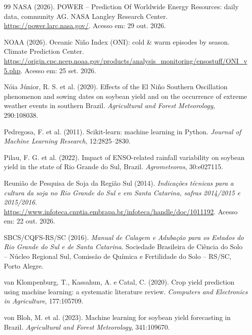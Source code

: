 \documentclass[12pt]{article}
\begin{document}
\begin{thebibliography}{99}
NASA (2026). POWER -- Prediction Of Worldwide Energy Resources: daily
data, community AG. NASA Langley Research Center.
\url{https://power.larc.nasa.gov/}. Acesso em: 29 out. 2026.

NOAA (2026). Oceanic Niño Index (ONI): cold \& warm episodes by season.
Climate Prediction Center.
\url{https://origin.cpc.ncep.noaa.gov/products/analysis_monitoring/ensostuff/ONI_v5.php}.
Acesso em: 25 set. 2026.

Nóia Júnior, R. S. et al. (2020). Effects of the El Niño Southern
Oscillation phenomenon and sowing dates on soybean yield and on the
occurrence of extreme weather events in southern Brazil. \emph{Agricultural
and Forest Meteorology}, 290:108038.

Pedregosa, F. et al. (2011). Scikit-learn: machine learning in Python.
\emph{Journal of Machine Learning Research}, 12:2825--2830.

Pilau, F. G. et al. (2022). Impact of ENSO-related rainfall variability on
soybean yield in the state of Rio Grande do Sul, Brazil.
\emph{Agrometeoros}, 30:e027115.

Reunião de Pesquisa de Soja da Região Sul (2014). \emph{Indicações técnicas
para a cultura da soja no Rio Grande do Sul e em Santa Catarina, safras
2014/2015 e 2015/2016}.
\url{https://www.infoteca.cnptia.embrapa.br/infoteca/handle/doc/1011192}.
Acesso em: 22 out. 2026.

SBCS/CQFS-RS/SC (2016). \emph{Manual de Calagem e Adubação para os Estados
do Rio Grande do Sul e de Santa Catarina}. Sociedade Brasileira de Ciência
do Solo -- Núcleo Regional Sul, Comissão de Química e Fertilidade do Solo --
RS/SC, Porto Alegre.

van Klompenburg, T., Kassahun, A. e Catal, C. (2020). Crop yield prediction
using machine learning: a systematic literature review. \emph{Computers and
Electronics in Agriculture}, 177:105709.

von Bloh, M. et al. (2023). Machine learning for soybean yield forecasting
in Brazil. \emph{Agricultural and Forest Meteorology}, 341:109670.

\end{thebibliography}
\end{document}
